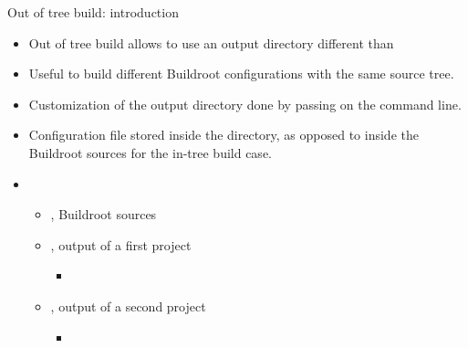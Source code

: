 \begin{frame}{Out of tree build: introduction}
  \begin{itemize}
  \item Out of tree build allows to use an output directory different
    than 
  \item Useful to build different Buildroot configurations with the
    same source tree.
  \item Customization of the output directory done by passing
     on the command line.
  \item Configuration file stored inside the  directory, as
    opposed to inside the Buildroot sources for the in-tree build
    case.
  \item {}
    \begin{itemize}
    \item {}, Buildroot sources
    \item {}, output of a first project
      \begin{itemize}
      \item {}
      \end{itemize}
    \item {}, output of a second project
      \begin{itemize}
      \item {}
      \end{itemize}
    \end{itemize}
  \end{itemize}
\end{frame}


